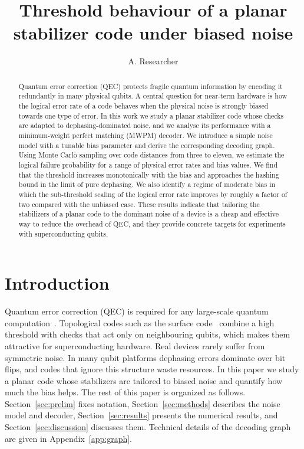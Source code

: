 \documentclass[aps,pra,twocolumn,superscriptaddress]{revtex4-2}
\begin{document}
\title{Threshold behaviour of a planar stabilizer code under biased noise}
\author{A. Researcher}

\begin{abstract}
Quantum error correction (QEC) protects fragile quantum information by encoding it redundantly in many physical qubits. A central question for near-term hardware is how the logical error rate of a code behaves when the physical noise is strongly biased towards one type of error. In this work we study a planar stabilizer code whose checks are adapted to dephasing-dominated noise, and we analyse its performance with a minimum-weight perfect matching (MWPM) decoder. We introduce a simple noise model with a tunable bias parameter and derive the corresponding decoding graph. Using Monte Carlo sampling over code distances from three to eleven, we estimate the logical failure probability for a range of physical error rates and bias values. We find that the threshold increases monotonically with the bias and approaches the hashing bound in the limit of pure dephasing. We also identify a regime of moderate bias in which the sub-threshold scaling of the logical error rate improves by roughly a factor of two compared with the unbiased case. These results indicate that tailoring the stabilizers of a planar code to the dominant noise of a device is a cheap and effective way to reduce the overhead of QEC, and they provide concrete targets for experiments with superconducting qubits.
\end{abstract}

\maketitle

\section{Introduction}\label{sec:intro}
Quantum error correction (QEC) is required for any large-scale quantum computation~\cite{shor1995,nielsen2010}. Topological codes such as the surface code~\cite{kitaev2003,dennis2002} combine a high threshold with checks that act only on neighbouring qubits, which makes them attractive for superconducting hardware.
Real devices rarely suffer from symmetric noise. In many qubit platforms dephasing errors dominate over bit flips, and codes that ignore this structure waste resources.
In this paper we study a planar code whose stabilizers are tailored to biased noise and quantify how much the bias helps.
The rest of this paper is organized as follows. Section~\ref{sec:prelim} fixes notation, Section~\ref{sec:methods} describes the noise model and decoder, Section~\ref{sec:results} presents the numerical results, and Section~\ref{sec:discussion} discusses them. Technical details of the decoding graph are given in Appendix~\ref{app:graph}.
\end{document}
